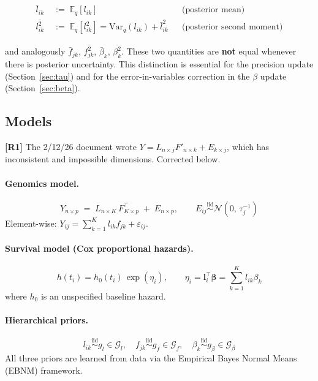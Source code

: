 \documentclass[11pt]{article}
\newcommand{\lbar}[2]{\bar{l}_{#1#2}}
\newcommand{\fbar}[2]{\bar{f}_{#1#2}}
\newcommand{\betabar}[1]{\bar{\beta}_{#1}}
\newcommand{\lsec}[2]{\overline{l^2_{#1#2}}}
\newcommand{\fsec}[2]{\overline{f^2_{#1#2}}}
\newcommand{\betasec}[1]{\overline{\beta^2_{#1}}}
\begin{document}
\begin{align}
  \lbar{i}{k} &\;:=\; \mathbb{E}_q[l_{ik}]
                & &\text{(posterior mean)} \label{eq:lbar}\\
  \lsec{i}{k}  &\;:=\; \mathbb{E}_q[l_{ik}^2]
                 = \mathrm{Var}_q(l_{ik}) + \lbar{i}{k}^2
                & &\text{(posterior second moment)} \label{eq:lsec}
\end{align}

and analogously $\fbar{j}{k}$, $\fsec{j}{k}$, $\betabar{k}$,
$\betasec{k}$.  These two quantities are \textbf{not} equal whenever there is
posterior uncertainty.  This distinction is essential for the precision update
(Section~\ref{sec:tau}) and for the error-in-variables correction in the
$\beta$ update (Section~\ref{sec:beta}).

\subsection{Models}

\begin{correctionbox}
\textbf{[R1]} The 2/12/26 document wrote $Y = L_{n\times j}F'_{n\times k} + E_{k\times j}$,
which has inconsistent and impossible dimensions.  Corrected below.
\end{correctionbox}

\paragraph{Genomics model.}
\begin{equation}\label{eq:genomics-model}
  Y_{n\times p} \;=\; L_{n\times K}\,F^{\top}_{K\times p} \;+\; E_{n\times p},
  \qquad E_{ij} \overset{\text{iid}}{\sim} \mathcal{N}\!\left(0,\,\tau_j^{-1}\right)
\end{equation}
Element-wise: $Y_{ij} = \sum_{k=1}^K l_{ik} f_{jk} + \varepsilon_{ij}$.

\paragraph{Survival model (Cox proportional hazards).}
\begin{equation}\label{eq:survival-model}
  h(t_i) = h_0(t_i)\,\exp\!\left(\eta_i\right), \qquad
  \eta_i = \bm{l}_i^{\top}\bm{\beta} = \sum_{k=1}^K l_{ik}\beta_k
\end{equation}
where $h_0$ is an unspecified baseline hazard.

\paragraph{Hierarchical priors.}
\[
  l_{ik} \overset{\text{iid}}{\sim} g_l \in \mathcal{G}_l, \quad
  f_{jk} \overset{\text{iid}}{\sim} g_f \in \mathcal{G}_f, \quad
  \beta_k  \overset{\text{iid}}{\sim} g_\beta \in \mathcal{G}_\beta
\]
All three priors are learned from data via the Empirical Bayes Normal Means
(EBNM) framework.
\end{document}

